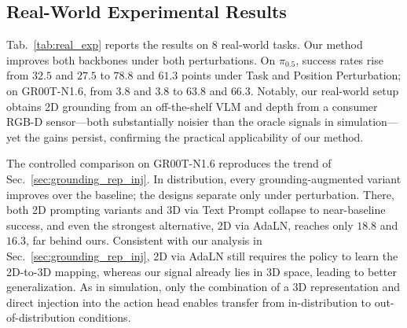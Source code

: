 \subsection{Real-World Experimental Results}
\label{sec:subsec:real-world-experimental-results}

Tab.~\ref{tab:real_exp} reports the results on 8 real-world tasks. 
Our method improves both backbones under both perturbations. On $\pi_{0.5}$, success rates rise from $32.5$ and $27.5$ to $78.8$ and $61.3$ points under Task and Position Perturbation; on GR00T-N1.6, from $3.8$ and $3.8$ to $63.8$ and $66.3$. Notably, our real-world setup obtains 2D grounding from an off-the-shelf VLM and depth from a consumer RGB-D sensor---both substantially noisier than the oracle signals in simulation---yet the gains persist, confirming the practical applicability of our method.

The controlled comparison on GR00T-N1.6 reproduces the trend of Sec.~\ref{sec:grounding_rep_inj}. In distribution, every grounding-augmented variant improves over the baseline; the designs separate only under perturbation. There, both 2D prompting variants and 3D via Text Prompt collapse to near-baseline success, and even the strongest alternative, 2D via AdaLN, reaches only $18.8$ and $16.3$, far behind ours. Consistent with our analysis in Sec.~\ref{sec:grounding_rep_inj}, 2D via AdaLN still requires the policy to learn the 2D-to-3D mapping, whereas our signal already lies in 3D space, leading to better generalization. As in simulation, only the combination of a 3D representation and direct injection into the action head enables transfer from in-distribution to out-of-distribution conditions.

